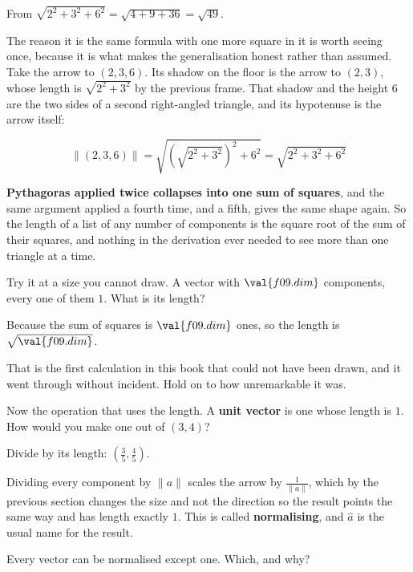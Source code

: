 \begin{fr}
From $\sqrt{2^{2} + 3^{2} + 6^{2}} = \sqrt{4 + 9 + 36} = \sqrt{49}$.

The reason it is the same formula with one more square in it is worth seeing
once, because it is what makes the generalisation honest rather than assumed.
Take the arrow to $(2, 3, 6)$. Its shadow on the floor is the arrow to
$(2, 3)$, whose length is $\sqrt{2^{2} + 3^{2}}$ by the previous frame. That
shadow and the height $6$ are the two sides of a second right-angled triangle,
and its hypotenuse is the arrow itself:

\[ \lVert (2, 3, 6) \rVert = \sqrt{\left(\sqrt{2^{2} + 3^{2}}\right)^{2} + 6^{2}}
   = \sqrt{2^{2} + 3^{2} + 6^{2}} \]

\textbf{Pythagoras applied twice collapses into one sum of squares}, and the
same argument applied a fourth time, and a fifth, gives the same shape again.
So the length of a list of any number of components is the square root of the
sum of their squares, and nothing in the derivation ever needed to see more
than one triangle at a time.

\end{fr}

\begin{fr}
Try it at a size you cannot draw. A vector with $\val{f09.dim}$ components,
every one of them $1$. What is its length?
\nextframe
\end{fr}

\begin{fr}
Because the sum of squares is $\val{f09.dim}$ ones, so the length is
$\sqrt{\val{f09.dim}}$.

That is the first calculation in this book that could not have been drawn, and
it went through without incident. Hold on to how unremarkable it was.

Now the operation that uses the length. A \textbf{unit vector} is one whose
length is $1$. How would you make one out of $(3, 4)$?
\nextframe
\end{fr}

\begin{fr}
\begin{ansblock}
Divide by its length: $\left(\frac{3}{5}, \frac{4}{5}\right)$.
\end{ansblock}

Dividing every component by $\lVert a \rVert$ scales the arrow by
$\frac{1}{\lVert a \rVert}$, which by the previous section changes the size and
not the direction \dash{} so the result points the same way and has length
exactly $1$. This is called \textbf{normalising}, and $\hat{a}$ is the usual
name for the result.

Every vector can be normalised except one. Which, and why?
\nextframe
\end{fr}

